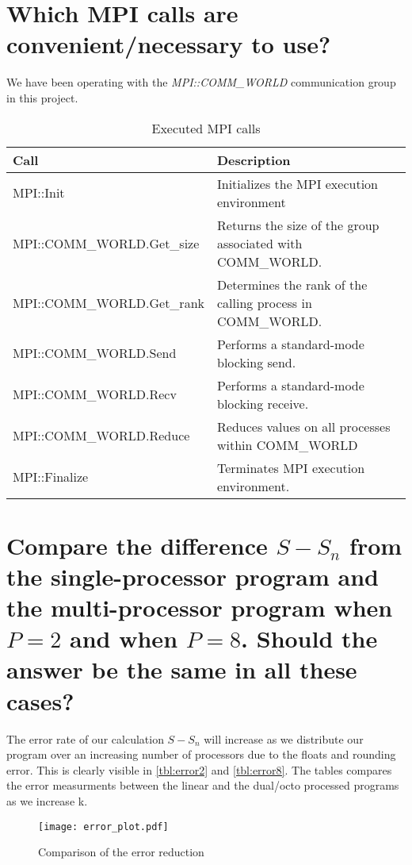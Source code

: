 \documentclass[a4paper]{article} %
\begin{document}
\section{Which MPI calls are convenient/necessary to use?}
We have been operating with the \emph{MPI::COMM\_WORLD} communication group in this project.
\begin{table}[hbt]
  \begin{center}
    \begin{tabular}{|l|p{20em}| }
      \hline
      \textbf{Call} & \textbf{Description}\\
      \hline
      MPI::Init & Initializes the MPI execution environment\\ \hline
      MPI::COMM\_WORLD.Get\_size & Returns the size of the group associated with COMM\_WORLD. \\ \hline
      MPI::COMM\_WORLD.Get\_rank & Determines the rank of the calling process in COMM\_WORLD.\\ \hline
      MPI::COMM\_WORLD.Send & Performs a standard-mode blocking send.\\ \hline
      MPI::COMM\_WORLD.Recv & Performs a standard-mode blocking receive.\\ \hline
      MPI::COMM\_WORLD.Reduce & Reduces values on all processes within COMM\_WORLD\\ \hline
      MPI::Finalize & Terminates MPI execution environment. \\
      \hline
    \end{tabular}
  \end{center}
  \caption{Executed MPI calls}
\end{table}
   
   
\section{Compare the difference $S - S_n$ from the single-processor program and the multi-processor program when $P = 2$ and when $P = 8$. Should the answer be the same in all these cases?}
The error rate of our calculation $S - S_n$ will increase as we distribute our program over an increasing number of processors due to the floats and rounding error. This is clearly visible in \autoref{tbl:error2} and \autoref{tbl:error8}. The tables compares the error measurments between the linear and the dual/octo processed programs as we increase k.


\begin{figure}[ht!]
\center \texttt{[image: error\_plot.pdf]}
\caption{Comparison of the error reduction}
\end{figure}
\end{document}
